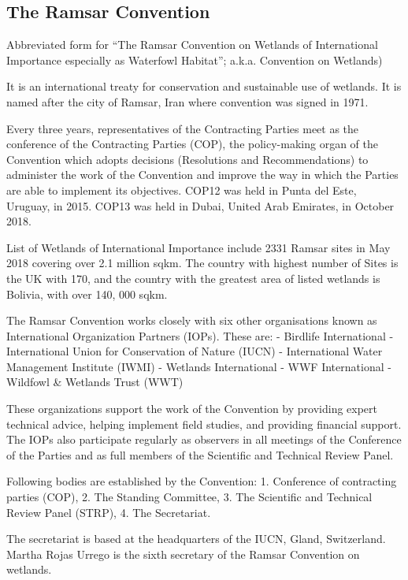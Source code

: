 \documentclass[
  openany]{book}
\begin{document}
\hypertarget{the-ramsar-convention}{%
\subsection{The Ramsar Convention}\label{the-ramsar-convention}}

Abbreviated form for ``The Ramsar Convention on Wetlands of International Importance especially as Waterfowl Habitat''; a.k.a. Convention on Wetlands)

It is an international treaty for conservation and sustainable use of wetlands. It is named after the city of Ramsar, Iran where convention was signed in 1971.

Every three years, representatives of the Contracting Parties meet as the conference of the Contracting Parties (COP), the policy-making organ of the Convention which adopts decisions (Resolutions and Recommendations) to administer the work of the Convention and improve the way in which the Parties are able to implement its objectives. COP12 was held in Punta del Este, Uruguay, in 2015. COP13 was held in Dubai, United Arab Emirates, in October 2018.

List of Wetlands of International Importance include 2331 Ramsar sites in May 2018 covering over 2.1 million sqkm. The country with highest number of Sites is the UK with 170, and the country with the greatest area of listed wetlands is Bolivia, with over 140, 000 sqkm.

The Ramsar Convention works closely with six other organisations known as International Organization Partners (IOPs). These are:
- Birdlife International
- International Union for Conservation of Nature (IUCN)
- International Water Management Institute (IWMI)
- Wetlands International
- WWF International
- Wildfowl \& Wetlands Trust (WWT)

These organizations support the work of the Convention by providing expert technical advice, helping implement field studies, and providing financial support. The IOPs also participate regularly as observers in all meetings of the Conference of the Parties and as full members of the Scientific and Technical Review Panel.

Following bodies are established by the Convention: 1. Conference of contracting parties (COP), 2. The Standing Committee, 3. The Scientific and Technical Review Panel (STRP), 4. The Secretariat.

The secretariat is based at the headquarters of the IUCN, Gland, Switzerland. Martha Rojas Urrego is the sixth secretary of the Ramsar Convention on wetlands.
\end{document}
